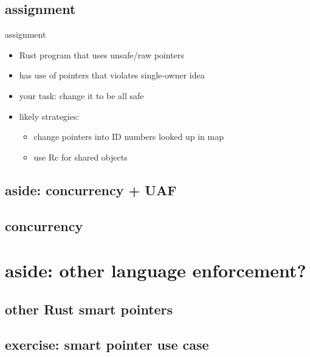 \subsection{assignment}
\begin{frame}{assignment}
    \begin{itemize}
    \item Rust program that uses unsafe/raw pointers
    \item has use of pointers that violates single-owner idea
    \vspace{.5cm}
    \item your task: change it to be all safe
    \item likely strategies:
        \begin{itemize}
        \item change pointers into ID numbers looked up in map
        \item use Rc for shared objects
        \end{itemize}
    \end{itemize}
\end{frame}

\subsection{aside: concurrency + UAF}


\subsection{concurrency}


\section{aside: other language enforcement?}



\subsection{other Rust smart pointers}


\subsection{exercise: smart pointer use case}


